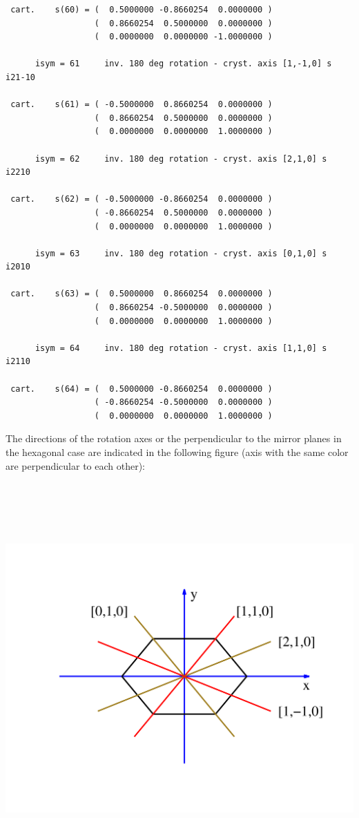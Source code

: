 \documentclass[12pt,a4paper]{article}
\begin{document}
\begin{verbatim}
 cart.    s(60) = (  0.5000000 -0.8660254  0.0000000 )
                  (  0.8660254  0.5000000  0.0000000 )
                  (  0.0000000  0.0000000 -1.0000000 )

      isym = 61     inv. 180 deg rotation - cryst. axis [1,-1,0] s     i21-10

 cart.    s(61) = ( -0.5000000  0.8660254  0.0000000 )
                  (  0.8660254  0.5000000  0.0000000 )
                  (  0.0000000  0.0000000  1.0000000 )

      isym = 62     inv. 180 deg rotation - cryst. axis [2,1,0] s      i2210

 cart.    s(62) = ( -0.5000000 -0.8660254  0.0000000 )
                  ( -0.8660254  0.5000000  0.0000000 )
                  (  0.0000000  0.0000000  1.0000000 )

      isym = 63     inv. 180 deg rotation - cryst. axis [0,1,0] s      i2010

 cart.    s(63) = (  0.5000000  0.8660254  0.0000000 )
                  (  0.8660254 -0.5000000  0.0000000 )
                  (  0.0000000  0.0000000  1.0000000 )

      isym = 64     inv. 180 deg rotation - cryst. axis [1,1,0] s      i2110

 cart.    s(64) = (  0.5000000 -0.8660254  0.0000000 )
                  ( -0.8660254 -0.5000000  0.0000000 )
                  (  0.0000000  0.0000000  1.0000000 )

\end{verbatim}
The directions of the rotation axes or the perpendicular to the mirror
planes in the hexagonal case are indicated in the following figure
(axis with the same color are perpendicular to each other):
\begin{center}
\includegraphics[width=15cm,height=15cm]{figure_hex.pdf} 
\end{center}
\end{document}
